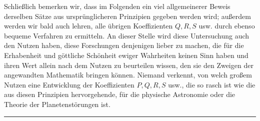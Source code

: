 Schließlich bemerken wir, dass im Folgenden ein viel allgemeinerer Beweis derselben
Sätze aus ursprünglicheren Prinzipien gegeben werden wird; außerdem werden wir bald auch lehren, alle
übrigen Koeffizienten $Q,R,S$ usw. durch ebenso bequeme Verfahren zu ermitteln.
An dieser Stelle wird diese Untersuchung auch den Nutzen haben, diese Forschungen denjenigen
lieber zu machen, die für die Erhabenheit und göttliche Schönheit ewiger Wahrheiten keinen Sinn haben
und ihren Wert allein nach dem Nutzen zu beurteilen wissen, den sie den Zweigen der
angewandten Mathematik bringen können. Niemand verkennt, von welch großem Nutzen
eine Entwicklung der Koeffizienten $P,Q,R,S$ usw., die so rasch ist wie die aus diesen Prinzipien
hervorgehende, für die physische Astronomie oder die Theorie der Planetenstörungen ist.


\par\begin{center}\rule{.15\linewidth}{.4pt}\end{center}
\clearpage
\endgroup
